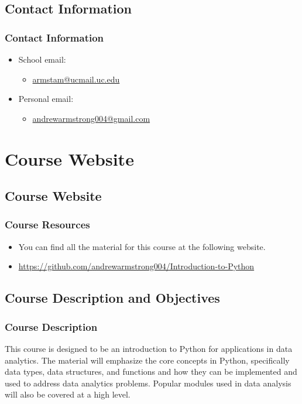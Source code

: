 \documentclass[mini frame in current subsection]{beamer}
\begin{document}
	\subsection{Contact Information}
		\begin{frame}
			\frametitle{Contact Information}
				\begin{itemize}
					\vfill\item  School email:  
						\begin{itemize}
							\item  \href{mailto:armstam@ucmail.uc.edu}{armstam@ucmail.uc.edu}
						\end{itemize}
					\vfill\item  Personal email:  
						\begin{itemize}
							\item  \href{mailto:andrewarmstrong004@gmail.com}{andrewarmstrong004@gmail.com}
						\end{itemize}
				\end{itemize}\vspace{2.5em}
		\end{frame}
		
\section{Course Website}
	\subsection{Course Website}
	
		\begin{frame}
			\frametitle{Course Resources}
			\begin{itemize}
				\vfill\item  You can find all the material for this course at the following website.
				\vfill\item  \url{https://github.com/andrewarmstrong004/Introduction-to-Python}
			\end{itemize}
		\end{frame}
		
	
	\subsection{Course Description and Objectives}
		\begin{frame}
			\frametitle{Course Description}
			
				This course is designed to be an introduction to Python for applications in data analytics.  The material will emphasize the core concepts in Python, specifically data types, data structures, and functions and how they can be implemented and used to address data analytics problems.  Popular modules used in data analysis will also be covered at a high level.
				
		\end{frame}
		
\end{document}
